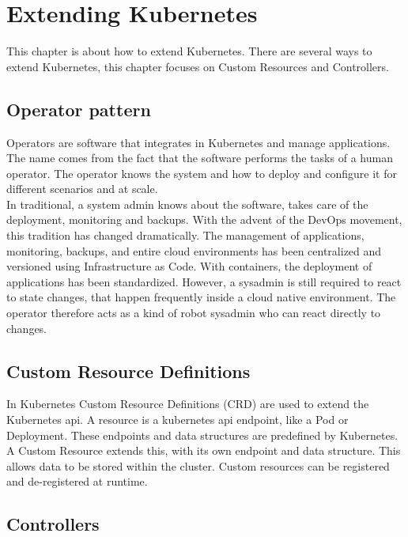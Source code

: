 \chapter{Extending Kubernetes}

This chapter is about how to extend Kubernetes.
There are several ways to extend Kubernetes, this chapter focuses on Custom Resources and Controllers.

\section{Operator pattern}\label{sec:operator-pattern}

Operators are software that integrates in Kubernetes and manage applications.
The name comes from the fact that the software performs the tasks of a human operator.
The operator knows the system and how to deploy and configure it for different scenarios and at scale.~\cite{KUBERNETES-OPERATOR}
\\
In traditional, a system admin knows about the software, takes care of the deployment, monitoring and backups.
With the advent of the DevOps movement, this tradition has changed dramatically.
The management of applications, monitoring, backups, and entire cloud environments has been centralized and versioned using Infrastructure as Code.
With containers, the deployment of applications has been standardized.
However, a sysadmin is still required to react to state changes, that happen frequently inside a cloud native environment.
The operator therefore acts as a kind of robot sysadmin who can react directly to changes.~\cite{RED-HAT-OPERATOR}

\section{Custom Resource Definitions}\label{sec:custom-resource-definitions}

In Kubernetes Custom Resource Definitions (CRD) are used to extend the Kubernetes api.
A resource is a kubernetes api endpoint, like a Pod or Deployment.
These endpoints and data structures are predefined by Kubernetes.
A Custom Resource extends this, with its own endpoint and data structure.
This allows data to be stored within the cluster.
Custom resources can be registered and de-registered at runtime.~\cite{KUBERNETES-CRD}


\section{Controllers}\label{sec:controllers}

